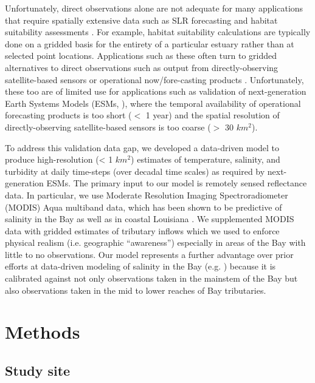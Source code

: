 \documentclass{article}
\begin{document}
Unfortunately, direct observations alone are not adequate for many applications that require spatially extensive data such as SLR forecasting and habitat suitability assessments \citep{hoodChesapeakeBayProgram2021}. For example, habitat suitability calculations are typically done on a gridded basis for the entirety of a particular estuary rather than at selected point locations. Applications such as these often turn to gridded alternatives to direct observations such as output from directly-observing satellite-based sensors \citep{foreCombinedActivePassive2016} or operational now/fore-casting products \citep{lanerolle2011second}. Unfortunately, these too are of limited use for applications such as validation of next-generation Earth Systems Models (ESMs, \citet{golazDOEE3SMModel2022}), where the temporal availability of operational forecasting products is too short ($<$ 1 year) and the spatial resolution of directly-observing satellite-based sensors is too coarse ($>$ 30 $km^2$).

To address this validation data gap, we developed a data-driven model to produce high-resolution (< 1 $km^2$) estimates of temperature, salinity, and turbidity at daily time-steps (over decadal time scales) as required by next-generation ESMs. The primary input to our model is remotely sensed reflectance data. In particular, we use Moderate Resolution Imaging Spectroradiometer (MODIS) Aqua multiband data, which has been shown to be predictive of salinity in the Bay as well as in coastal Louisiana \citep{vogelAssessingSatelliteSea2016, wangDevelopmentMODISData2018}. We supplemented MODIS data with gridded estimates of tributary inflows which we used to enforce physical realism (i.e. geographic “awareness”) especially in areas of the Bay with little to no observations. Our model represents a further advantage over prior efforts at data-driven modeling of salinity in the Bay (e.g. \citet{vogelAssessingSatelliteSea2016, murphyComparisonSpatialInterpolation2010}) because it is calibrated against not only observations taken in the mainstem of the Bay but also observations taken in the mid to lower reaches of Bay tributaries.


\section{Methods}

\subsection{Study site}
\end{document}
